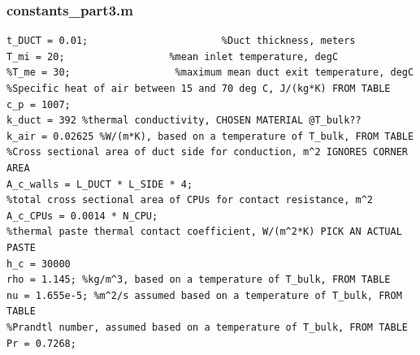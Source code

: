 \documentclass[12pt, titlepage]{article}
\begin{document}
\subsubsection{constants\_part3.m}
\begin{verbatim}
t_DUCT = 0.01;                       %Duct thickness, meters
T_mi = 20;                  %mean inlet temperature, degC 
%T_me = 30;                  %maximum mean duct exit temperature, degC
%Specific heat of air between 15 and 70 deg C, J/(kg*K) FROM TABLE
c_p = 1007;
k_duct = 392 %thermal conductivity, CHOSEN MATERIAL @T_bulk??
k_air = 0.02625 %W/(m*K), based on a temperature of T_bulk, FROM TABLE
%Cross sectional area of duct side for conduction, m^2 IGNORES CORNER AREA
A_c_walls = L_DUCT * L_SIDE * 4;
%total cross sectional area of CPUs for contact resistance, m^2
A_c_CPUs = 0.0014 * N_CPU;
%thermal paste thermal contact coefficient, W/(m^2*K) PICK AN ACTUAL PASTE
h_c = 30000
rho = 1.145; %kg/m^3, based on a temperature of T_bulk, FROM TABLE
nu = 1.655e-5; %m^2/s assumed based on a temperature of T_bulk, FROM TABLE
%Prandtl number, assumed based on a temperature of T_bulk, FROM TABLE
Pr = 0.7268;
\end{verbatim}
\end{document}
